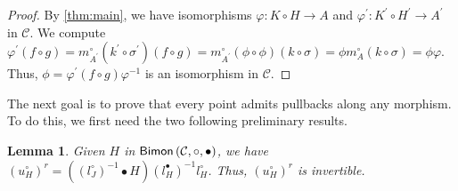 \documentclass[nosumlimits,twoside]{amsart}
\newtheorem{lemma}[lemma]{\sc Lemma}
\theoremstyle{definition}
\theoremstyle{remark}
\newcommand{\Cc}{\mathcal{C}}
\def\Bimon{{\sf Bimon}}
\begin{document}
\begin{proof}
By \cref{thm:main}, we have isomorphisms $\varphi :K\circ H\rightarrow A$ and $\varphi
^{\prime }:K^{\prime }\circ H^{\prime }\rightarrow A^{\prime }$ in $\Cc$. We compute
$\varphi ^{\prime }\left( f\circ g\right) =m_{A^{\prime }}^{\circ }\left(
k^{\prime }\circ \sigma ^{\prime }\right) \left( f\circ g\right)
=m_{A^{\prime }}^{\circ }\left( \phi \circ \phi \right) \left( k\circ \sigma
\right) =\phi m_{A}^{\circ }\left( k\circ \sigma \right) =\phi \varphi$.
Thus, $\phi =\varphi ^{\prime }\left( f\circ g\right) \varphi ^{-1}$ is an isomorphism in $\Cc$.
\end{proof}

The next goal is to prove that every point admits pullbacks along any morphism. To do this, we first need the two following preliminary results.

\begin{lemma}
\label{lem:urinv}
Given $H$ in $\Bimon\left( \Cc,\circ,\bullet\right) $, we have $%
\left( u_{H}^{\circ }\right) ^{r}=\left( \left( l_{J}^{\circ
}\right) ^{-1}\bullet H\right) \left( l_{H}^{\bullet }\right)
^{-1}l_{H}^{\circ }$. Thus, $\left( u_{H}^{\circ }\right) ^{r}$ is invertible.
\end{lemma}
\end{document}
